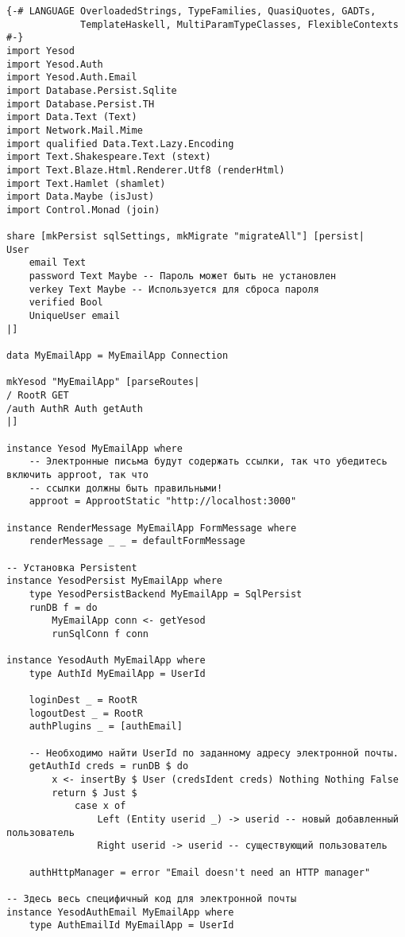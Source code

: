 \begin{lstlisting}
{-# LANGUAGE OverloadedStrings, TypeFamilies, QuasiQuotes, GADTs,
             TemplateHaskell, MultiParamTypeClasses, FlexibleContexts #-}
import Yesod
import Yesod.Auth
import Yesod.Auth.Email
import Database.Persist.Sqlite
import Database.Persist.TH
import Data.Text (Text)
import Network.Mail.Mime
import qualified Data.Text.Lazy.Encoding
import Text.Shakespeare.Text (stext)
import Text.Blaze.Html.Renderer.Utf8 (renderHtml)
import Text.Hamlet (shamlet)
import Data.Maybe (isJust)
import Control.Monad (join)

share [mkPersist sqlSettings, mkMigrate "migrateAll"] [persist|
User
    email Text
    password Text Maybe -- Пароль может быть не установлен
    verkey Text Maybe -- Используется для сброса пароля
    verified Bool
    UniqueUser email
|]

data MyEmailApp = MyEmailApp Connection

mkYesod "MyEmailApp" [parseRoutes|
/ RootR GET
/auth AuthR Auth getAuth
|]

instance Yesod MyEmailApp where
    -- Электронные письма будут содержать ссылки, так что убедитесь включить approot, так что
    -- ссылки должны быть правильными!
    approot = ApprootStatic "http://localhost:3000"

instance RenderMessage MyEmailApp FormMessage where
    renderMessage _ _ = defaultFormMessage

-- Установка Persistent
instance YesodPersist MyEmailApp where
    type YesodPersistBackend MyEmailApp = SqlPersist
    runDB f = do
        MyEmailApp conn <- getYesod
        runSqlConn f conn

instance YesodAuth MyEmailApp where
    type AuthId MyEmailApp = UserId

    loginDest _ = RootR
    logoutDest _ = RootR
    authPlugins _ = [authEmail]

    -- Необходимо найти UserId по заданному адресу электронной почты.
    getAuthId creds = runDB $ do
        x <- insertBy $ User (credsIdent creds) Nothing Nothing False
        return $ Just $
            case x of
                Left (Entity userid _) -> userid -- новый добавленный пользователь
                Right userid -> userid -- существующий пользователь

    authHttpManager = error "Email doesn't need an HTTP manager"

-- Здесь весь специфичный код для электронной почты
instance YesodAuthEmail MyEmailApp where
    type AuthEmailId MyEmailApp = UserId


\end{lstlisting}

